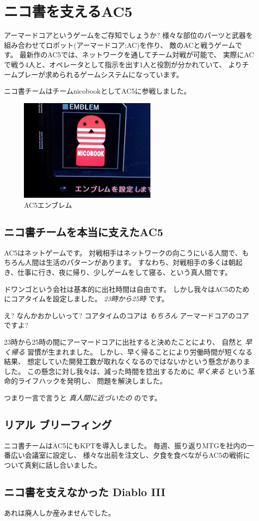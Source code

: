 \section{ニコ書を支えるAC5}

アーマードコアというゲームをご存知でしょうか?
様々な部位のパーツと武器を組み合わせてロボット(アーマードコア;AC)を作り、
敵のACと戦うゲームです。
最新作のAC5では、ネットワークを通してチーム対戦が可能で、
実際にACで戦う4人と、オペレータとして指示を出す1人と役割が分かれていて、
よりチームプレーが求められるゲームシステムになっています。

ニコ書チームはチームnicobookとしてAC5に参戦しました。

\begin{figure}[H]
\centering
\includegraphics[width=0.6\textwidth]{../images/ac5_emb.jpg}
\caption{AC5エンブレム}
\end{figure}

\subsection{ニコ書チームを本当に支えたAC5}

AC5はネットゲームです。
対戦相手はネットワークの向こうにいる人間で、もちろん人間は生活のパターンがあります。
すなわち、対戦相手の多くは朝起き、仕事に行き、夜に帰り、少しゲームをして寝る、という真人間です。

ドワンゴという会社は基本的に出社時間は自由です。
しかし我々はAC5のためにコアタイムを設定しました。 \emph{23時から25時}
です。

え? なんかおかしいって? コアタイムのコアは \emph{もちろん}
アーマードコアのコアですよ?

23時から25時の間にアーマードコアに出社すると決めたことにより、 自然と
\emph{早く帰る} 習慣が生まれました。
しかし、早く帰ることにより労働時間が短くなる結果、
想定していた開発工数が取れなくなるのではないかという懸念がありました。
この懸念に対し我々は、減った時間を捻出するために \emph{早く来る}
という革命的ライフハックを発明し、 問題を解決しました。

つまり一言で言うと \emph{真人間に近づいたの} のです。

\subsection{リアル ブリーフィング}

ニコ書チームはAC5にもKPTを導入しました。
毎週、振り返りMTGを社内の一番広い会議室に設定し、
様々な出前を注文し、夕食を食べながらAC5の戦術について真剣に話し合いました。

\subsection{ニコ書を支えなかった Diablo III}

あれは廃人しか産みませんでした。
